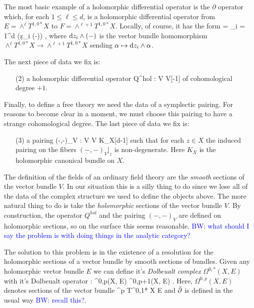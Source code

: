 \documentclass[10pt]{amsart}
\def\brian{\textcolor{blue}{BW: }\textcolor{blue}}
\begin{document}
The most basic example of a holomorphic differential operator is the $\partial$ operator which, for each $1 \leq \ell \leq d$, is a holomorphic differential operator from $E = \wedge^\ell T^{1,0*}X$ to $F = \wedge^{\ell+1} T^{1,0*}X$. 
Locally, of course, it has the form
\ben
\partial = \sum_{i = 1}^{d} (\d z_i \wedge (-)) ,
\een
where ${\rm d} z_i \wedge (-)$ is the vector bundle homomorphism $\wedge^\ell T^{1,0*}X \to \wedge^{\ell+1} T^{1,0*}X$ sending $\alpha \mapsto {\rm d} z_i \wedge \alpha$. 

The next piece of data we fix is:
\begin{itemize}
\item[(2)] a holomorphic differential operator 
\ben
Q^{hol} : V \to V[-1]
\een
of cohomological degree $+1$. 
\end{itemize}

Finally, to define a free theory we need the data of a symplectic pairing. 
For reasons to become clear in a moment, we must choose this pairing to have a strange cohomological degree. 
The last piece of data we fix is:
\begin{itemize}
\item[(3)] a pairing 
\ben
(-,-)_V : V \tensor V \to K_{X}[d-1]
\een
such that for each $z \in X$ the induced pairing on the fibers $(-,-)_V|_{z}$ is non-degenerate.
Here $K_X$ is the holomorphic canonical bundle on $X$. 
\end{itemize}

The definition of the fields of an ordinary field theory are the {\em smooth} sections of the vector bundle $V$. 
In our situation this is a silly thing to do since we lose all of the data of the complex structure we used to define the objects above. 
The more natural thing to do is take the {\em holomorphic} sections of the vector bundle $V$. 
By construction, the operator $Q^{hol}$ and the pairing $(-,-)_V$ are defined on holomorphic sections, so on the surface this seems reasonable. 
\brian{what should I say the problem is with doing things in the analytic category?}

The solution to this problem is in the existence of a resolution for the holomorphic sections of a vector bundle by smooth sections of bundles. 
Given any holomorphic vector bundle $E$ we can define it's {\em Dolbeualt complex} $\Omega^{0,*}(X , E)$ with it's Dolbeualt operator 
\ben
\dbar : \Omega^{0,p}(X, E) \to \Omega^{0,p+1}(X, E) .
\een
Here, $\Omega^{0,p}(X, E)$ denotes sections of the vector bundle
\ben
\Wedge^p T^{0,1*} X \tensor E
\een
and $\Bar{\partial}$ is defined in the usual way \brian{recall this?}.
\end{document}

